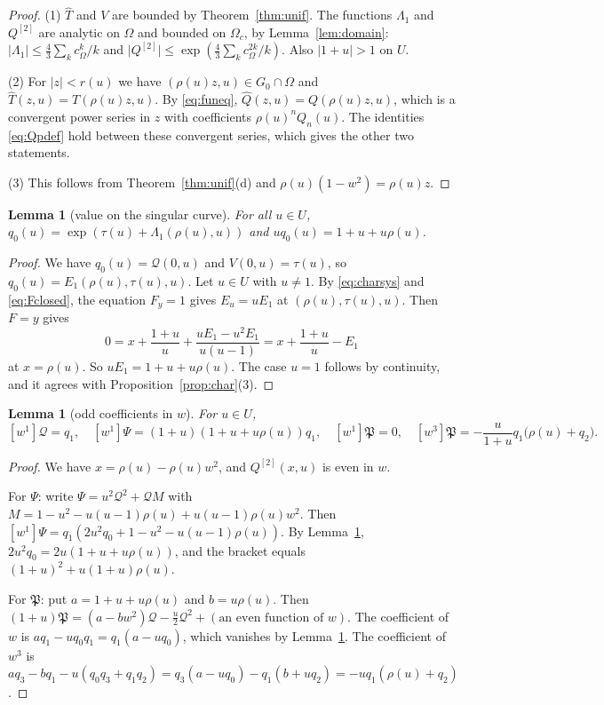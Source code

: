\documentclass[11pt]{amsart}
\newtheorem{lemma}[theorem]{Lemma}
\theoremstyle{definition}
\theoremstyle{remark}
\numberwithin{equation}{section}
\newcommand{\fP}{\mathfrak{P}}
\newcommand{\cQ}{\mathcal{Q}}
\newcommand{\abs}[1]{\lvert #1\rvert}
\begin{document}
\begin{proof}
(1) \(\hat T\) and \(V\) are bounded by Theorem~\ref{thm:unif}. The functions \(\Lambda_1\) and \(Q^{[2]}\) are analytic on \(\Omega\) and bounded on \(\Omega_c\), by Lemma~\ref{lem:domain}: \(\abs{\Lambda_1}\le\frac43\sum_kc_\Omega^k/k\) and \(\abs{Q^{[2]}}\le\exp(\frac43\sum_kc_\Omega^{2k}/k)\). Also \(\abs{1+u}>1\) on \(U\).

(2) For \(\abs{z}<r(u)\) we have \((\rho(u)z,u)\in G_0\cap\Omega\) and \(\hat T(z,u)=T(\rho(u)z,u)\). By \eqref{eq:funeq}, \(\hat Q(z,u)=Q(\rho(u)z,u)\), which is a convergent power series in \(z\) with coefficients \(\rho(u)^nQ_n(u)\). The identities \eqref{eq:Qpdef} hold between these convergent series, which gives the other two statements.

(3) This follows from Theorem~\ref{thm:unif}(d) and \(\rho(u)(1-w^2)=\rho(u)z\).
\end{proof}

\begin{lemma}[value on the singular curve]\label{lem:q0}
For all \(u\in U\), \(q_0(u)=\exp(\tau(u)+\Lambda_1(\rho(u),u))\) and \(uq_0(u)=1+u+u\rho(u)\).
\end{lemma}

\begin{proof}
We have \(q_0(u)=\cQ(0,u)\) and \(V(0,u)=\tau(u)\), so \(q_0(u)=E_1(\rho(u),\tau(u),u)\). Let \(u\in U\) with \(u\ne1\). By \eqref{eq:charsys} and \eqref{eq:Fclosed}, the equation \(F_y=1\) gives \(E_u=uE_1\) at \((\rho(u),\tau(u),u)\). Then \(F=y\) gives
\[
0=x+\frac{1+u}{u}+\frac{uE_1-u^2E_1}{u(u-1)}=x+\frac{1+u}{u}-E_1
\]
at \(x=\rho(u)\). So \(uE_1=1+u+u\rho(u)\). The case \(u=1\) follows by continuity, and it agrees with Proposition~\ref{prop:char}(3).
\end{proof}

\begin{lemma}[odd coefficients in \(w\)]\label{lem:odd}
For \(u\in U\),
\[
[w^1]\cQ=q_1,\quad[w^1]\Psi=(1+u)(1+u+u\rho(u))q_1,\quad[w^1]\fP=0,\quad[w^3]\fP=-\frac{u}{1+u}q_1\bigl(\rho(u)+q_2\bigr).
\]
\end{lemma}

\begin{proof}
We have \(x=\rho(u)-\rho(u)w^2\), and \(Q^{[2]}(x,u)\) is even in \(w\).

For \(\Psi\): write \(\Psi=u^2\cQ^2+\cQ M\) with \(M=1-u^2-u(u-1)\rho(u)+u(u-1)\rho(u)w^2\). Then \([w^1]\Psi=q_1(2u^2q_0+1-u^2-u(u-1)\rho(u))\). By Lemma~\ref{lem:q0}, \(2u^2q_0=2u(1+u+u\rho(u))\), and the bracket equals \((1+u)^2+u(1+u)\rho(u)\).

For \(\fP\): put \(a=1+u+u\rho(u)\) and \(b=u\rho(u)\). Then \((1+u)\fP=(a-bw^2)\cQ-\frac u2\cQ^2+(\text{an even function of }w)\). The coefficient of \(w\) is \(aq_1-uq_0q_1=q_1(a-uq_0)\), which vanishes by Lemma~\ref{lem:q0}. The coefficient of \(w^3\) is \(aq_3-bq_1-u(q_0q_3+q_1q_2)=q_3(a-uq_0)-q_1(b+uq_2)=-uq_1(\rho(u)+q_2)\).
\end{proof}
\end{document}
